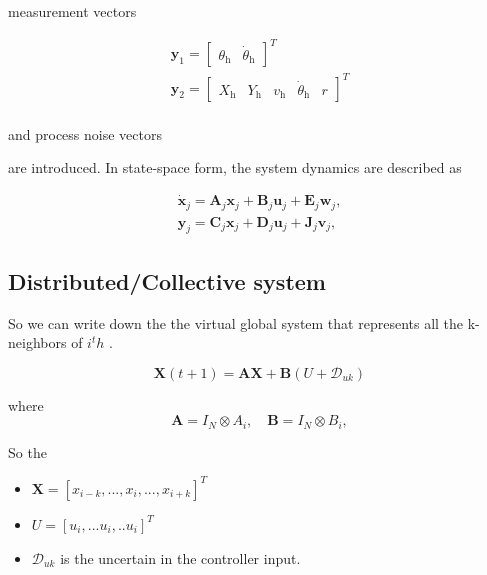\documentclass[letterpaper, 10pt, conference]{ieeeconf}  %
\begin{document}
measurement vectors

$$
\begin{array}{c}
\mathbf{y}_1=\left[\begin{array}{ll}
 \theta_{\mathrm{h}} & \dot{\theta}_{\mathrm{h}}
\end{array}\right]^T \\
\mathbf{y}_2=\left[\begin{array}{lllll}
 X_{\mathrm{h}} & Y_{\mathrm{h}} & v_{\mathrm{h}} & \dot{\theta}_{\mathrm{h}} & r
\end{array} \right]^T \\
\end{array}
$$

and process noise vectors



are introduced. In state-space form, the system dynamics are described as

$$
\begin{aligned}
\dot{\mathbf{x}}_j=\mathbf{A}_j \mathbf{x}_j+\mathbf{B}_j \mathbf{u}_j+\mathbf{E}_j \mathbf{w}_j, \\
\mathbf{y}_j=\mathbf{C}_j \mathbf{x}_j+\mathbf{D}_j \mathbf{u}_j+\mathbf{J}_j \mathbf{v}_j,
\end{aligned}
$$

   
\subsection{Distributed/Collective system}


So we can write down the the virtual global system that represents all the k-neighbors of $i^th$ . 



\begin{equation}\label{CACC_dis_neibor}
        \mathbf{{X}}(t+1)=\mathbf{A} \mathbf{X} + \mathbf{B}({U + \mathcal{D}_{uk}}) 
\end{equation}

where 
\begin{equation*}
\mathbf{A} = I_N \otimes A_i, \quad \mathbf{B} = I_N \otimes B_i,
\end{equation*}




So the 

\begin{itemize}
\item $\mathbf{X} = [x_{i-k},..., x_{i} ,..., x_{i+k}]^T$ 
\item $U = [u_i , ... u_i ,.. u_i ]^T$ 


 \item $\mathcal{D}_{uk}$ is the uncertain in the controller input. 
 \end{itemize}
\end{document}
